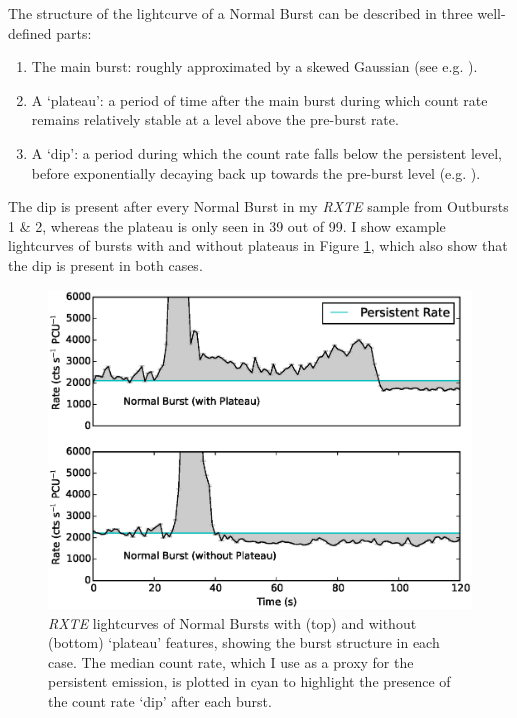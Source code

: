 \par The structure of the lightcurve of a Normal Burst can be described in three well-defined parts:

\begin{enumerate}
\item The main burst: roughly approximated by a skewed Gaussian (see e.g. \citealp{Azzalini_Dist}).
\item A `plateau': a period of time after the main burst during which count rate remains relatively stable at a level above the pre-burst rate.
\item A `dip': a period during which the count rate falls below the persistent level, before exponentially decaying back up towards the pre-burst level (e.g. \citealp{Younes_Expo}).
\end{enumerate}

\par The dip is present after every Normal Burst in my \indexrxte\textit{RXTE} sample from Outbursts 1 \& 2, whereas the plateau is only seen in 39 out of 99.  I show example lightcurves of bursts with and without plateaus in Figure \ref{fig:w_wo}, which also show that the dip is present in both cases.

\begin{figure}
  \centering
  \includegraphics[width=.9\linewidth, trim={0.8cm 0 1.6cm 0},clip]{images/w_woburst.eps}
  \caption[\textit{RXTE} lightcurves of Normal Bursts with (top) and without (bottom) `plateau' features, showing the burst structure in each case.]{\small \indexrxte\textit{RXTE} lightcurves of Normal Bursts with (top) and without (bottom) `plateau' features, showing the burst structure in each case.  The median count rate, which I use as a proxy for the persistent emission, is plotted in cyan to highlight the presence of the count rate `dip' after each burst.}
  \label{fig:w_wo}
\end{figure}

